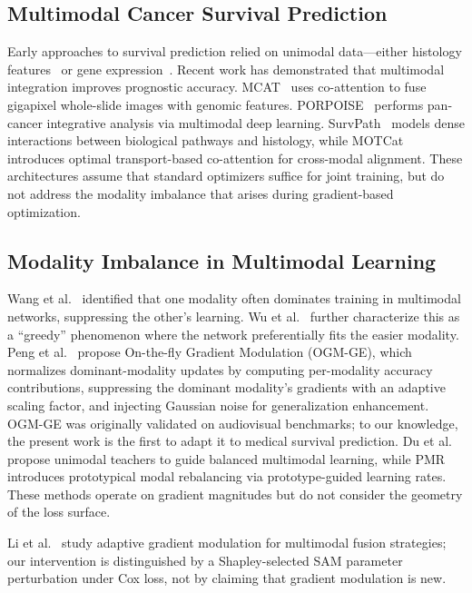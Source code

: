 \documentclass[runningheads]{llncs}
\begin{document}
\subsection{Multimodal Cancer Survival Prediction}

Early approaches to survival prediction relied on unimodal
data---either histology features~\cite{he2016, lu2021abmil} or gene
expression~\cite{katzman2018}. Recent work has demonstrated that
multimodal integration improves prognostic accuracy.
MCAT~\cite{chen2021} uses co-attention to fuse gigapixel whole-slide
images with genomic features. PORPOISE~\cite{chen2022porpoise}
performs pan-cancer integrative analysis via multimodal deep learning.
SurvPath~\cite{jaume2024survpath} models dense interactions between
biological pathways and histology, while
MOTCat~\cite{xu2023motcat} introduces optimal transport-based
co-attention for cross-modal alignment.
These architectures assume that standard optimizers suffice for
joint training, but do not address the modality imbalance that arises
during gradient-based optimization.

\subsection{Modality Imbalance in Multimodal Learning}

Wang et al.~\cite{wang2020what} identified that one modality often
dominates training in multimodal networks, suppressing the other's
learning. Wu et al.~\cite{wu2022greedy} further characterize this as
a ``greedy'' phenomenon where the network preferentially fits the
easier modality. Peng et al.~\cite{peng2022ogm} propose On-the-fly
Gradient Modulation (OGM-GE), which normalizes dominant-modality
updates by computing per-modality accuracy contributions, suppressing
the dominant modality's gradients with an adaptive scaling factor, and
injecting Gaussian noise for generalization enhancement. OGM-GE was
originally validated on audiovisual benchmarks; to our knowledge, the
present work is the first to adapt it to medical survival prediction.
Du et al.~\cite{du2023unimodal} propose unimodal teachers to guide
balanced multimodal learning, while PMR~\cite{fan2023pmr} introduces
prototypical modal rebalancing via prototype-guided learning rates.
These methods operate on gradient magnitudes but do not consider the
geometry of the loss surface.

Li et al.~\cite{li2023agm} study adaptive gradient modulation
for multimodal fusion strategies; our intervention is distinguished
by a Shapley-selected SAM parameter perturbation under Cox loss,
not by claiming that gradient modulation is new.
\end{document}
